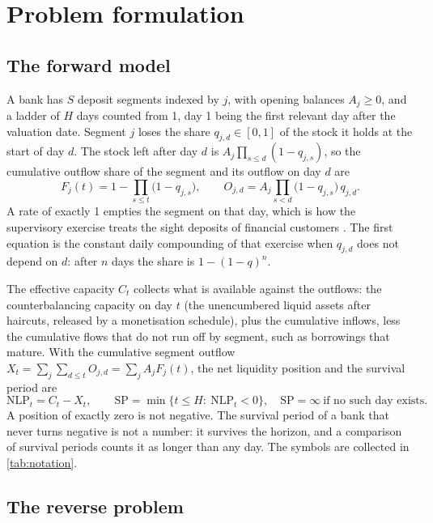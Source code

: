 \section{Problem formulation}
\label{sec:problem}

\subsection{The forward model}

A bank has $S$ deposit segments indexed by $j$, with opening balances $A_j\ge 0$, and a ladder of $H$ days counted from 1, day 1 being the first relevant day after the valuation date. Segment $j$ loses the share $q_{j,d}\in[0,1]$ of the stock it holds at the start of day $d$. The stock left after day $d$ is $A_j\prod_{s\le d}(1-q_{j,s})$, so the cumulative outflow share of the segment and its outflow on day $d$ are
\begin{equation}
F_j(t)=1-\prod_{s\le t}\bigl(1-q_{j,s}\bigr),\qquad O_{j,d}=A_j\prod_{s<d}\bigl(1-q_{j,s}\bigr)\,q_{j,d}.
\label{eq:outflow}
\end{equation}
A rate of exactly 1 empties the segment on that day, which is how the supervisory exercise treats the sight deposits of financial customers \citep{ecblist2019}. The first equation is the constant daily compounding of that exercise when $q_{j,d}$ does not depend on $d$: after $n$ days the share is $1-(1-q)^n$.

The effective capacity $C_t$ collects what is available against the outflows: the counterbalancing capacity on day $t$ (the unencumbered liquid assets after haircuts, released by a monetisation schedule), plus the cumulative inflows, less the cumulative flows that do not run off by segment, such as borrowings that mature. With the cumulative segment outflow $X_t=\sum_j\sum_{d\le t}O_{j,d}=\sum_j A_jF_j(t)$, the net liquidity position and the survival period are
\begin{equation}
\mathrm{NLP}_t=C_t-X_t,\qquad \mathrm{SP}=\min\{t\le H:\ \mathrm{NLP}_t<0\},\quad \mathrm{SP}=\infty\ \text{if no such day exists}.
\label{eq:nlp-sp}
\end{equation}
A position of exactly zero is not negative. The survival period of a bank that never turns negative is not a number: it survives the horizon, and a comparison of survival periods counts it as longer than any day. The symbols are collected in \cref{tab:notation}.



\subsection{The reverse problem}

